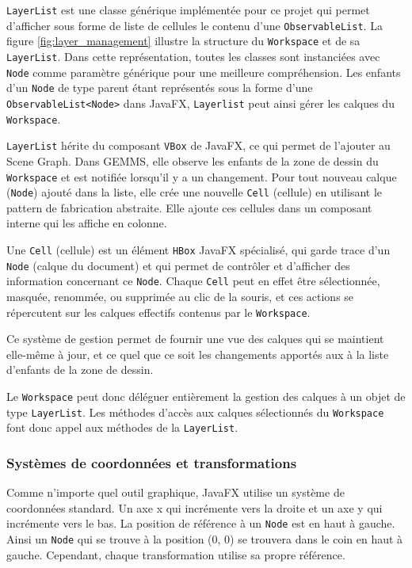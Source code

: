 \texttt{LayerList} est une classe générique implémentée pour ce projet qui permet d'afficher sous forme de liste de cellules le contenu d'une \texttt{ObservableList}. La figure \ref{fig:layer_management} illustre la structure du \texttt{Workspace} et de sa \texttt{LayerList}. Dans cette représentation, toutes les classes sont instanciées avec \texttt{Node} comme paramètre générique pour une meilleure compréhension. Les enfants d'un \texttt{Node} de type parent étant représentés sous la forme d'une \texttt{ObservableList<Node>} dans JavaFX, \texttt{Layerlist} peut ainsi gérer les calques du \texttt{Workspace}.

\texttt{LayerList} hérite du composant \texttt{VBox} de JavaFX, ce qui permet de l'ajouter au Scene Graph. Dans GEMMS, elle observe les enfants de la zone de dessin du \texttt{Workspace} et est notifiée lorsqu'il y a un changement. Pour tout nouveau calque (\texttt{Node}) ajouté dans la liste, elle crée une nouvelle \texttt{Cell} (cellule) en utilisant le pattern de fabrication abstraite. Elle ajoute ces cellules dans un composant interne qui les affiche en colonne.

Une \texttt{Cell} (cellule) est un élément \texttt{HBox} JavaFX spécialisé, qui garde trace d'un \texttt{Node} (calque du document) et qui permet de contrôler et d'afficher des information concernant ce \texttt{Node}. Chaque \texttt{Cell} peut en effet être sélectionnée, masquée, renommée, ou supprimée au clic de la souris, et ces actions se répercutent sur les calques effectifs contenus par le \texttt{Workspace}. 

Ce système de gestion permet de fournir une vue des calques qui se maintient elle-même à jour, et ce quel que ce soit les changements apportés aux à la liste d'enfants de la zone de dessin.

Le \texttt{Workspace} peut donc déléguer entièrement la gestion des calques à un objet de type \texttt{LayerList}. Les méthodes d'accès aux calques sélectionnés du \texttt{Workspace} font donc appel aux méthodes de la \texttt{LayerList}.



\subsubsection{Systèmes de coordonnées et transformations}
Comme n'importe quel outil graphique, JavaFX utilise un système de coordonnées standard. Un axe x qui incrémente vers la droite et un axe y qui incrémente vers le bas. La position de référence à un \texttt{Node} est en haut à gauche. Ainsi un \texttt{Node} qui se trouve à la position (0, 0) se trouvera dans le coin en haut à gauche. Cependant, chaque transformation utilise sa propre référence.

